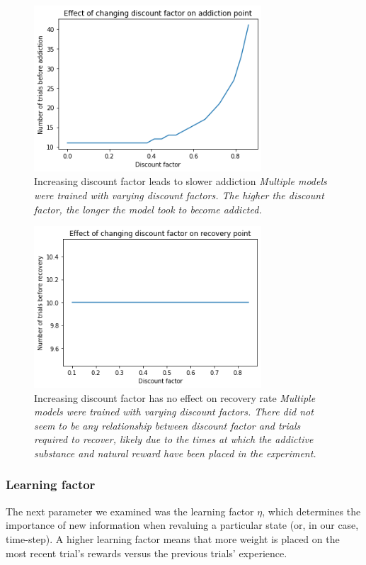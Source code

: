 \documentclass[10pt,letterpaper]{article}
\begin{document}
\begin{figure}[H]
   \centering
    \includegraphics[width = 85mm]{graphs/discount_addiction.png}
    \caption{Increasing discount factor leads to slower addiction
    \newline \emph{Multiple models were trained with varying discount factors. The higher the discount factor, the longer the model took to become addicted.}}
    \label{fig:Baseline}
\end{figure}

\begin{figure}[H]
   \centering
    \includegraphics[width = 85mm]{graphs/discount_recovery.png}
    \caption{Increasing discount factor has no effect on recovery rate
    \newline \emph{Multiple models were trained with varying discount factors. There did not seem to be any relationship between discount factor and trials required to recover, likely due to the times at which the addictive substance and natural reward have been placed in the experiment.}}
    \label{fig:Baseline}
\end{figure}

\subsubsection{Learning factor}
The next parameter we examined was the learning factor $\eta$, which determines the importance of new information when revaluing a particular state (or, in our case, time-step). A higher learning factor means that more weight is placed on the most recent trial's rewards versus the previous trials' experience.
\end{document}
